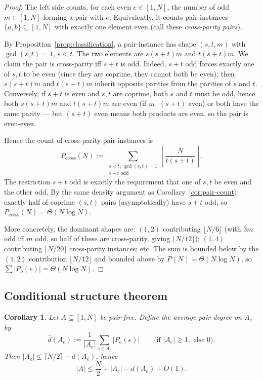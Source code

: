 \documentclass[11pt]{amsart}
\theoremstyle{plain}
\newtheorem{corollary}[theorem]{Corollary}
\theoremstyle{definition}
\begin{document}
\begin{proof}
The left side counts, for each even $e \in [1, N]$, the number of odd $m \in [1, N]$ forming a pair with $e$. Equivalently, it counts pair-instances $\{a, b\} \subseteq [1, N]$ with exactly one element even (call these \emph{cross-parity pairs}).

By Proposition~\ref{prop:classification}, a pair-instance has shape $(s, t, m)$ with $\gcd(s, t) = 1$, $s < t$. The two elements are $s(s+t)m$ and $t(s+t)m$. We claim the pair is cross-parity iff $s + t$ is odd. Indeed, $s + t$ odd forces exactly one of $s, t$ to be even (since they are coprime, they cannot both be even); then $s(s+t)m$ and $t(s+t)m$ inherit opposite parities from the parities of $s$ and $t$. Conversely, if $s + t$ is even and $s, t$ are coprime, both $s$ and $t$ must be odd, hence both $s(s+t)m$ and $t(s+t)m$ are even (if $m \cdot (s + t)$ even) or both have the same parity --- but $(s+t)$ even means both products are even, so the pair is even-even.

Hence the count of cross-parity pair-instances is
\[
  P_{\text{cross}}(N) := \sum_{\substack{s < t,\ \gcd(s, t) = 1 \\ s + t \text{ odd}}} \left\lfloor \frac{N}{t(s + t)} \right\rfloor.
\]
The restriction $s + t$ odd is exactly the requirement that one of $s, t$ be even and the other odd. By the same density argument as Corollary~\ref{cor:pair-count}: exactly half of coprime $(s, t)$ pairs (asymptotically) have $s + t$ odd, so $P_{\text{cross}}(N) = \Theta(N \log N)$.

More concretely, the dominant shapes are: $(1, 2)$ contributing $\lfloor N/6 \rfloor$ (with $3m$ odd iff $m$ odd, so half of these are cross-parity, giving $\lfloor N/12 \rfloor$); $(1, 4)$ contributing $\lfloor N/20 \rfloor$ cross-parity instances; etc. The sum is bounded below by the $(1, 2)$ contribution $\lfloor N/12 \rfloor$ and bounded above by $P(N) = \Theta(N \log N)$, so $\sum |P_o(e)| = \Theta(N \log N)$.
\end{proof}

\subsection{Conditional structure theorem}

\begin{corollary}\label{prop:structure-corollary}
Let $A \subseteq [1, N]$ be pair-free. Define the \emph{average pair-degree on $A_e$} by
\[
  \bar{d}(A_e) := \frac{1}{|A_e|} \sum_{e \in A_e} |P_o(e)| \qquad \text{(if } |A_e| \geq 1, \text{ else } 0).
\]
Then $|A_o| \leq \lceil N/2 \rceil - \bar{d}(A_e)$, hence
\[
  |A| \leq \frac{N}{2} + |A_e| - \bar{d}(A_e) + O(1).
\]
\end{corollary}
\end{document}
